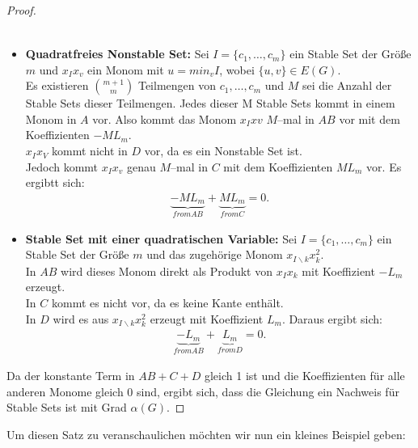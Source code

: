 \begin{proof}
\begin{itemize}
\begin{align*}
\end{align*}
\item \textbf{Quadratfreies Nonstable Set:} Sei $I=\{c_1,\ldots,c_m\}$ ein Stable Set der Größe $m$ und $x_Ix_v$ ein Monom mit $u=min_vI$, wobei $\{u,v\} \in E(G)$. \\
Es existieren $\binom{m+1}{m}$ Teilmengen von ${c_1,\ldots,c_m}$ und $M$ sei die Anzahl der Stable Sets dieser Teilmengen. Jedes dieser M Stable Sets kommt in einem Monom in $A$ vor. Also kommt das Monom $x_Ixv$ $M$--mal in \textbf{$AB$} vor mit dem Koeffizienten $-ML_m$.\\
$x_Ix_V$ kommt nicht in \textbf{$D$} vor, da es ein Nonstable Set ist.\\
Jedoch kommt $x_Ix_v$ genau $M$--mal  in \textbf{$C$} mit dem Koeffizienten $ML_m$ vor. Es ergibtt sich:
\begin{align*}
\underbrace{-ML_m}_{from AB} + \underbrace{ML_m}_{from C} = 0. 
\end{align*}
\item \textbf{Stable Set mit einer quadratischen Variable:} Sei $I=\{c_1,\ldots,c_m\}$ ein Stable Set der Größe $m$ und das zugehörige Monom $x_{I\backslash k}x_k^2$.\\
In \textbf{$AB$} wird dieses Monom direkt als Produkt von $x_Ix_k$ mit Koeffizient $-L_m$ erzeugt.\\
In \textbf{$C$} kommt es nicht vor, da es keine Kante enthält.\\
In \textbf{$D$} wird es aus $x_{I\backslash k}x_k^2$ erzeugt mit Koeffizient $L_m$. Daraus ergibt sich:
\begin{align*}
\underbrace{-L_m}_{from AB} + \underbrace{L_m}_{from D} = 0.
\end{align*}
\end{itemize}
Da der konstante Term in $AB+C+D$ gleich 1 ist und die Koeffizienten für alle anderen Monome gleich 0 sind, ergibt sich, dass die Gleichung ein Nachweis für Stable Sets ist mit Grad $\alpha(G)$.
\end{proof}

\noindent Um diesen Satz zu veranschaulichen möchten wir nun ein kleines Beispiel geben:

